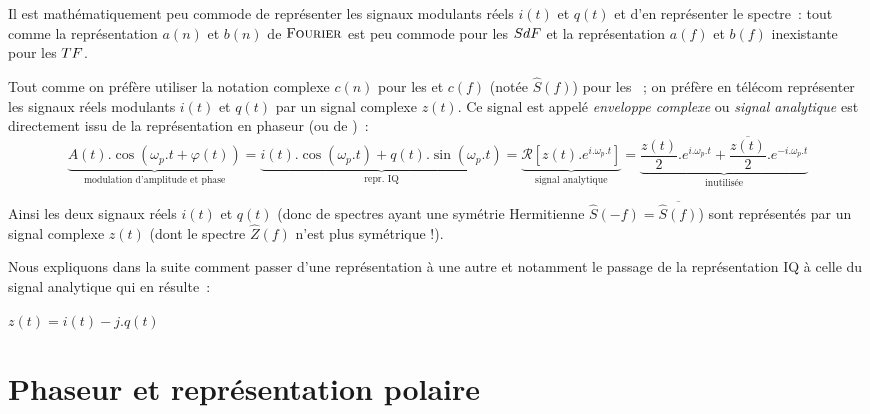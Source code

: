 Il est mathématiquement peu commode de représenter les signaux
modulants réels $i(t)$ et $q(t)$ et d'en représenter le spectre~: tout
comme la représentation $a(n)$ et $b(n)$ de $\textsc{Fourier}$ est peu commode
pour les $SdF{}$ et la représentation $a(f)$ et $b(f)$ inexistante
pour les $TF{}$.

Tout comme on préfère utiliser la notation complexe $c(n)$ pour les
\sdf{} et $c(f)$ (notée $\hat{S}(f)$) pour les \TF{}~; on préfère en
télécom représenter les signaux réels modulants $i(t)$ et $q(t)$ par
un signal complexe $z(t)$. Ce signal est appelé \emph{enveloppe
  complexe} ou \emph{signal analytique} est directement issu de la
représentation en phaseur (ou de \Fresnel{})~:
\begin{equation}
  \underbrace{ A(t).\cos\left(\omega_p.t+\varphi(t)\right)}_{\text{modulation d'amplitude et phase}} = \underbrace{i(t).\cos(\omega_p.t) + q(t).\sin(\omega_p.t)}_{\text{repr. IQ}} = \underbrace{\mathcal{R}\!\left[z(t). e^ {i.\omega_p.t}\right]}_{\text{signal analytique}} = \underbrace{\frac{z(t)}{2}.e^ {i.\omega_p.t} + \frac{\overline{z(t)}}{2}.e^ {-i.\omega_p.t}}_{\text{inutilisée}}
  \label{phaseur_egalites}
\end{equation}



Ainsi les deux signaux réels $i(t)$ et $q(t)$ (donc de spectres ayant
une symétrie Hermitienne $\widehat{S}(-f)=\overline{\widehat{S}(f)}$)
sont représentés par un signal complexe $z(t)$ (dont le spectre
$\widehat{Z}(f)$ n'est plus symétrique !).

Nous expliquons dans la suite comment passer d'une représentation à
une autre et notamment le passage de la représentation IQ à celle du
signal analytique qui en résulte~:

$z(t)=i(t) - j. q(t)$


\section{Phaseur et représentation polaire}







